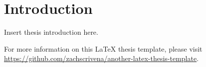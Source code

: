 \chapter{Introduction}

Insert thesis introduction here.
\lipsum[1-8]

For more information on this {\LaTeX} thesis template, please visit \url{https://github.com/zachscrivena/another-latex-thesis-template}.